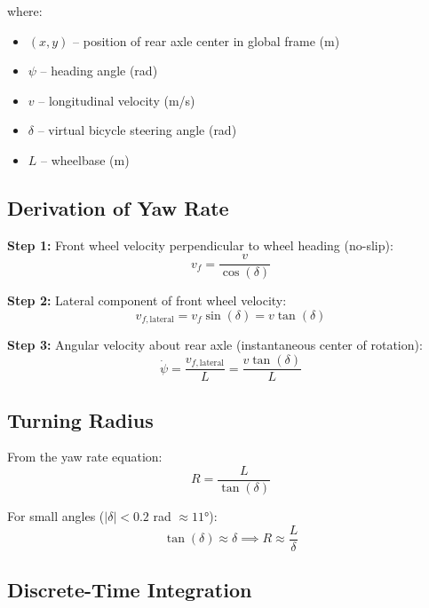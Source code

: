 \documentclass[11pt,a4paper]{article}
\begin{document}
where:
\begin{itemize}
    \item $(x, y)$ -- position of rear axle center in global frame (m)
    \item $\psi$ -- heading angle (rad)
    \item $v$ -- longitudinal velocity (m/s)
    \item $\delta$ -- virtual bicycle steering angle (rad)
    \item $L$ -- wheelbase (m)
\end{itemize}

\subsection{Derivation of Yaw Rate}

\textbf{Step 1:} Front wheel velocity perpendicular to wheel heading (no-slip):
\begin{equation}
v_f = \frac{v}{\cos(\delta)}
\end{equation}

\textbf{Step 2:} Lateral component of front wheel velocity:
\begin{equation}
v_{f,\text{lateral}} = v_f \sin(\delta) = v \tan(\delta)
\end{equation}

\textbf{Step 3:} Angular velocity about rear axle (instantaneous center of rotation):
\begin{equation}
\dot{\psi} = \frac{v_{f,\text{lateral}}}{L} = \frac{v \tan(\delta)}{L}
\end{equation}

\subsection{Turning Radius}

From the yaw rate equation:
\begin{equation}
R = \frac{L}{\tan(\delta)}
\end{equation}

For small angles ($|\delta| < 0.2$ rad $\approx 11°$):
\begin{equation}
\tan(\delta) \approx \delta \implies R \approx \frac{L}{\delta}
\end{equation}

\subsection{Discrete-Time Integration}
\end{document}
